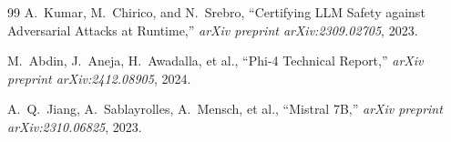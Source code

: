 \documentclass[11pt,a4paper]{article}
\begin{document}
\begin{thebibliography}{99}
A.~Kumar, M.~Chirico, and N.~Srebro, ``Certifying LLM Safety against Adversarial Attacks at Runtime,'' \textit{arXiv preprint arXiv:2309.02705}, 2023.

M.~Abdin, J.~Aneja, H.~Awadalla, et al., ``Phi-4 Technical Report,'' \textit{arXiv preprint arXiv:2412.08905}, 2024.

A.~Q.~Jiang, A.~Sablayrolles, A.~Mensch, et al., ``Mistral 7B,'' \textit{arXiv preprint arXiv:2310.06825}, 2023.

\end{thebibliography}
\end{document}
